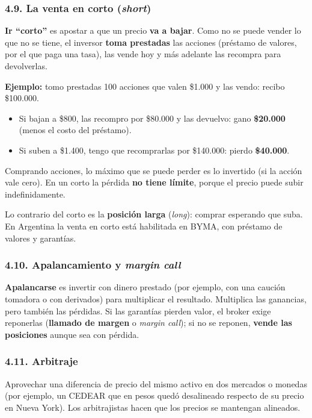 \subsubsection*{4.9. La venta en corto (\textit{short})}
\textbf{Ir ``corto''} es apostar a que un precio \textbf{va a bajar}. Como no se puede vender lo
que no se tiene, el inversor \textbf{toma prestadas} las acciones (préstamo de valores, por el
que paga una tasa), las vende hoy y más adelante las recompra para devolverlas.

\begin{recuadro}
\textbf{Ejemplo:} tomo prestadas 100 acciones que valen \$1.000 y las vendo: recibo \$100.000.
\begin{itemize}[leftmargin=*,nosep]
  \item Si bajan a \$800, las recompro por \$80.000 y las devuelvo: gano \textbf{\$20.000}
        (menos el costo del préstamo).
  \item Si suben a \$1.400, tengo que recomprarlas por \$140.000: pierdo \textbf{\$40.000}.
\end{itemize}
Comprando acciones, lo máximo que se puede perder es lo invertido (si la acción vale cero). En
un corto la pérdida \textbf{no tiene límite}, porque el precio puede subir indefinidamente.
\end{recuadro}

Lo contrario del corto es la \textbf{posición larga} (\textit{long}): comprar esperando que suba.
En Argentina la venta en corto está habilitada en BYMA, con préstamo de valores y garantías.

\subsubsection*{4.10. Apalancamiento y \textit{margin call}}
\textbf{Apalancarse} es invertir con dinero prestado (por ejemplo, con una caución tomadora o
con derivados) para multiplicar el resultado. Multiplica las ganancias, pero también las
pérdidas. Si las garantías pierden valor, el broker exige reponerlas (\textbf{llamado de
margen} o \textit{margin call}); si no se reponen, \textbf{vende las posiciones} aunque sea con
pérdida.

\subsubsection*{4.11. Arbitraje}
Aprovechar una diferencia de precio del mismo activo en dos mercados o monedas (por ejemplo, un
CEDEAR que en pesos quedó desalineado respecto de su precio en Nueva York). Los arbitrajistas
hacen que los precios se mantengan alineados.

